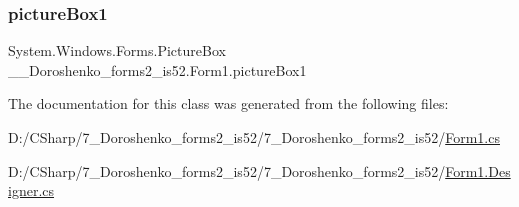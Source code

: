 \hypertarget{class__7___doroshenko__forms2__is52_1_1_form1_a933cbf3a176db517c87b626bd610c732}{}\label{class__7___doroshenko__forms2__is52_1_1_form1_a933cbf3a176db517c87b626bd610c732} 
\subsubsection{\texorpdfstring{picture\+Box1}{pictureBox1}}
{\footnotesize\ttfamily System.\+Windows.\+Forms.\+Picture\+Box \+\_\+\_\+\+Doroshenko\+\_\+forms2\+\_\+is52.\+Form1.\+picture\+Box1\hspace{0.3cm}{\ttfamily [private]}}



The documentation for this class was generated from the following files\+:\begin{DoxyCompactItemize}
\item 
D\+:/\+C\+Sharp/7\+\_\+\+Doroshenko\+\_\+forms2\+\_\+is52/7\+\_\+\+Doroshenko\+\_\+forms2\+\_\+is52/\hyperlink{_form1_8cs}{Form1.\+cs}\item 
D\+:/\+C\+Sharp/7\+\_\+\+Doroshenko\+\_\+forms2\+\_\+is52/7\+\_\+\+Doroshenko\+\_\+forms2\+\_\+is52/\hyperlink{_form1_8_designer_8cs}{Form1.\+Designer.\+cs}\end{DoxyCompactItemize}
